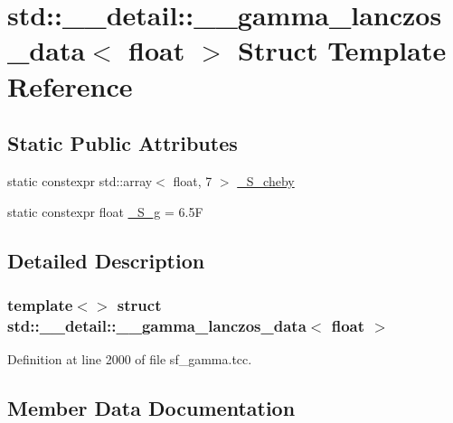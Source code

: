 \hypertarget{structstd_1_1____detail_1_1____gamma__lanczos__data_3_01float_01_4}{}\section{std\+:\+:\+\_\+\+\_\+detail\+:\+:\+\_\+\+\_\+gamma\+\_\+lanczos\+\_\+data$<$ float $>$ Struct Template Reference}
\label{structstd_1_1____detail_1_1____gamma__lanczos__data_3_01float_01_4}
\subsection*{Static Public Attributes}
\begin{DoxyCompactItemize}
\item 
static constexpr std\+::array$<$ float, 7 $>$ \hyperlink{structstd_1_1____detail_1_1____gamma__lanczos__data_3_01float_01_4_a2c49be7a79e21754e583099068cc1c3a}{\+\_\+\+S\+\_\+cheby}
\item 
static constexpr float \hyperlink{structstd_1_1____detail_1_1____gamma__lanczos__data_3_01float_01_4_aadc6da66fb542d6b88ddf3a0aef6249c}{\+\_\+\+S\+\_\+g} = 6.\+5F
\end{DoxyCompactItemize}


\subsection{Detailed Description}
\subsubsection*{template$<$$>$\newline
struct std\+::\+\_\+\+\_\+detail\+::\+\_\+\+\_\+gamma\+\_\+lanczos\+\_\+data$<$ float $>$}



Definition at line 2000 of file sf\+\_\+gamma.\+tcc.



\subsection{Member Data Documentation}
\mbox{\label{structstd_1_1____detail_1_1____gamma__lanczos__data_3_01float_01_4_a2c49be7a79e21754e583099068cc1c3a}} 
